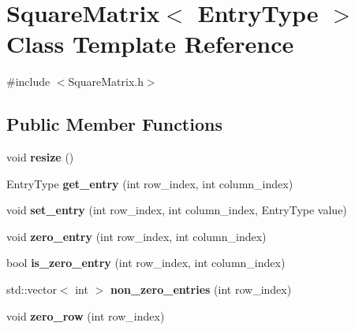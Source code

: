 \hypertarget{class_square_matrix}{}\section{Square\+Matrix$<$ Entry\+Type $>$ Class Template Reference}
\label{class_square_matrix}


{\ttfamily \#include $<$Square\+Matrix.\+h$>$}

\subsection*{Public Member Functions}
\begin{DoxyCompactItemize}
\item 
\mbox{\label{class_square_matrix_af447f09f06d4b03e5874cb1cb9ef5972}} 
void {\bfseries resize} ()
\item 
\mbox{\label{class_square_matrix_ab91388c1395bac074c957721c87c95f6}} 
Entry\+Type {\bfseries get\+\_\+entry} (int row\+\_\+index, int column\+\_\+index)
\item 
\mbox{\label{class_square_matrix_a185eba000b27312c9448e06fd1bbc1f1}} 
void {\bfseries set\+\_\+entry} (int row\+\_\+index, int column\+\_\+index, Entry\+Type value)
\item 
\mbox{\label{class_square_matrix_a0aa3d158824b73addf28ef78a335a346}} 
void {\bfseries zero\+\_\+entry} (int row\+\_\+index, int column\+\_\+index)
\item 
\mbox{\label{class_square_matrix_a9d993cf6ba070564a5ff86488a6b85f4}} 
bool {\bfseries is\+\_\+zero\+\_\+entry} (int row\+\_\+index, int column\+\_\+index)
\item 
\mbox{\label{class_square_matrix_a86345d02c6829b44b4fc9174df69b1ca}} 
std\+::vector$<$ int $>$ {\bfseries non\+\_\+zero\+\_\+entries} (int row\+\_\+index)
\item 
\mbox{\label{class_square_matrix_a0724c92d25be6bfde5d893e3330f33b4}} 
void {\bfseries zero\+\_\+row} (int row\+\_\+index)
\item 

\end{DoxyCompactItemize}
